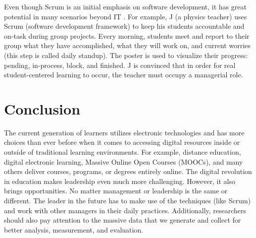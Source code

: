 \documentclass[doc,biblatex,apacite]{apa6}
\begin{document}
Even though Scrum is an initial emphasis on software development, it has great potential in many scenarios beyond IT \cite{RebeccaSullivan}.
For example, J (a physics teacher)  uses Scrum  (software development framework) to keep his students accountable and on-task during group projects. 
Every morning, students meet and report to their group what they have accomplished, what they will work on, and current worries (this step is called daily standup). 
The poster is used to visualize their progress: pending, in-process, block, and finished.
J is convinced that in order for real student-centered learning to occur, the teacher must occupy a managerial role.




\section{Conclusion}
The current generation of learners utilizes electronic technologies and has more choices than ever before when it comes to accessing digital resources inside or outside of traditional learning environments. 
For example, distance education, digital electronic learning, Massive Online Open Courses (MOOCs),  and many others deliver courses, programs, or degrees entirely online.
The digital revolution in education makes leadership even much more challenging. However, it also brings opportunities.
No matter management or leadership is the same or different.
The leader in the future has to make use of the techniques (like Scrum) and work with other managers in their daily practices.
Additionally, researchers should also pay attention to the massive data that we generate and collect for better analysis, measurement, and evaluation.


\end{document}
